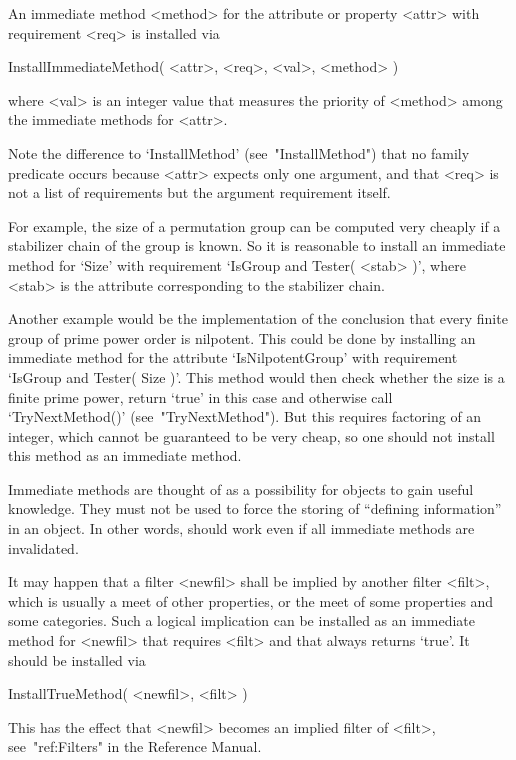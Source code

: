 An immediate method <method> for the attribute or property <attr>
with requirement <req> is installed via

\>InstallImmediateMethod( <attr>, <req>, <val>, <method> )

where <val> is an integer value that measures the priority of <method>
among the immediate methods for <attr>.

Note the difference to `InstallMethod' (see~"InstallMethod")
that no family predicate occurs
because <attr> expects only one argument,
and that <req> is not a list of requirements but the argument requirement
itself.

For example, the size of a permutation group can be computed very cheaply
if a stabilizer chain of the group is known.
So it is reasonable to install an immediate method for `Size' with
requirement `IsGroup and Tester( <stab> )',
where <stab> is the attribute corresponding to the stabilizer chain.

Another example would be the implementation of the conclusion that
every finite group of prime power order is nilpotent.
This could be done by installing an immediate method for the attribute
`IsNilpotentGroup' with requirement `IsGroup and Tester( Size )'.
This method would then check whether the size is a finite prime power,
return `true' in this case and otherwise call `TryNextMethod()'
(see~"TryNextMethod").
But this requires factoring of an integer,
which cannot be guaranteed to be very cheap,
so one should not install this method as an immediate method.

Immediate methods are thought of as a possibility for objects to gain
useful knowledge.
They must not be used to force the storing of ``defining information''
in an object.
In other words, {\GAP} should work even if all immediate methods are
invalidated.


It may happen that a filter <newfil> shall be implied by another filter
<filt>, which is usually a meet of other properties,
or the meet of some properties and some categories.
Such a logical implication can be installed as an immediate method for
<newfil> that requires <filt> and that always returns `true'.
It should be installed via

\>InstallTrueMethod( <newfil>, <filt> )

This has the effect that <newfil> becomes an implied filter of <filt>,
see~"ref:Filters" in the Reference Manual.

